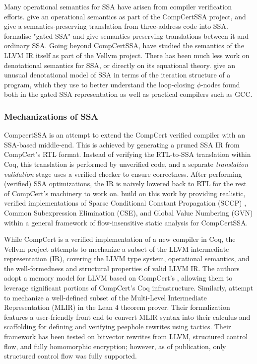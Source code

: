 \documentclass[acmsmall,screen,review]{acmart}
\begin{document}
Many operational semantics for SSA have arisen from compiler verification efforts.
\citet{barthe-compcert-ssa-2014} give an operational semantics as part of the CompCertSSA project,
and give a semantics-preserving translation from three-address code into SSA.
\citet{herklotz-gsa-2023} formalise "gated SSA" and give semantics-preserving translations between
it and ordinary SSA. Going beyond CompCertSSA, \citet{vellvm-12} have studied the semantics of the
LLVM IR itself as part of the Vellvm project. There has been much less work on denotational
semantics for SSA, or directly on its equational theory. \citet{pop-ssa-inout-2009} give an unusual
denotational model of SSA in terms of the iteration structure of a program, which they use to better
understand the loop-closing $\phi$-nodes found both in the gated SSA representation as well as
practical compilers such as GCC.

\subsubsection{Mechanizations of SSA}


CompcertSSA \cite{compcert-ssa-12} is an attempt to extend the CompCert verified compiler
\cite{leroy-compcert-09} with an SSA-based middle-end. This is achieved by generating a pruned SSA
IR from CompCert's RTL format. Instead of verifying the RTL-to-SSA translation within Coq, this
translation is performed by unverified code, and a separate \emph{translation validation} stage uses
a verified checker to ensure correctness. After performing (verified) SSA optimizations, the IR is
naively lowered back to RTL for the rest of CompCert's machinery to work on. \citet{demange-ssa-15} build on this work by providing realistic, verified implementations of Sparse Conditional Constant Propagation (SCCP) \cite{wegman-sccp-91}, Common Subexpression Elimination (CSE), and Global Value Numbering (GVN) \cite{rosen-gvn-1988} within a general framework of flow-insensitive static analysis for CompCertSSA.

While CompCert is a verified implementation of a new compiler in Coq, the Vellvm project
\cite{vellvm-12} attempts to mechanize a subset of the LLVM intermediate representation (IR),
covering the LLVM type system, operational semantics, and the well-formedness and structural
properties of valid LLVM IR. The authors adopt a memory model for LLVM based on CompCert's
\cite{leroy-compcert-09}, allowing them to leverage significant portions of CompCert's Coq
infrastructure. Similarly, \citet{siddharth-24-peephole} attempt to mechanize a well-defined subset
of the Multi-Level Intermediate Representation (MLIR) in the Lean 4 theorem prover. Their
formalization features a user-friendly front end to convert MLIR syntax into their calculus and
scaffolding for defining and verifying peephole rewrites using tactics. Their framework has been
tested on bitvector rewrites from LLVM, structured control flow, and fully homomorphic encryption;
however, as of publication, only structured control flow was fully supported.
\end{document}
